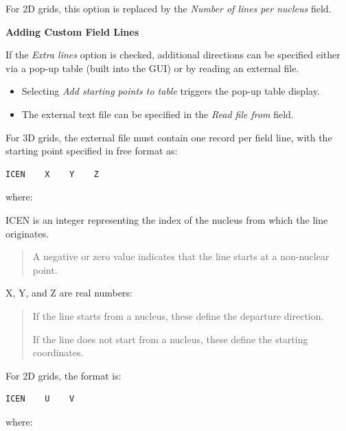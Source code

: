 \documentclass[10pt]{article}
\begin{document}
For 2D grids, this option is replaced by the {\it Number of lines per nucleus} field.

\vspace*{3mm}
{\bf Adding Custom Field Lines}
\vspace*{3mm}

If the {\it Extra lines} option is checked, additional directions
can be specified either via a pop-up table (built into the GUI)
or by reading an external file.

\begin{itemize}
\item Selecting {\it Add starting points to table} triggers the pop-up table display.
\item The external text file can be specified in the {\it Read file from} field.
\end{itemize}

For 3D grids, the external file must contain one record per field line,
with the starting point specified in free format as:

\begin{verbatim}
ICEN    X    Y    Z   
\end{verbatim}

where:

\begin{itemize}
\item ICEN is an integer representing the index of the nucleus from which the line originates.
\vspace*{-5mm}
\begin{quote}
\item A negative or zero value indicates that the line starts at a non-nuclear point.
\end{quote}

\item X, Y, and Z are real numbers:
\begin{quote}
\item If the line starts from a nucleus, these define the departure direction.
\item If the line does not start from a nucleus, these define the starting coordinates.
\end{quote}
\end{itemize}

For 2D grids, the format is:

\begin{verbatim}
ICEN    U    V   
\end{verbatim}

where:
\end{document}
